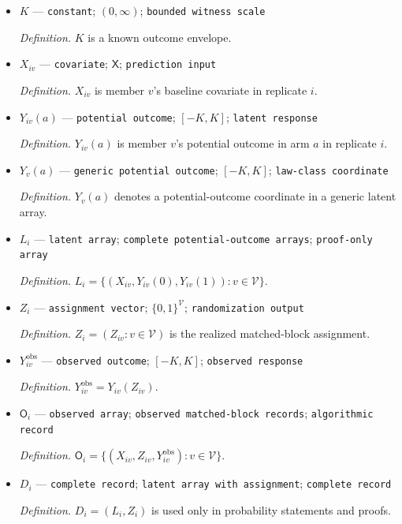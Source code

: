 \documentclass{article}
\begin{document}
\begin{itemize}
  \item \(K\) --- \texttt{constant}; \((0,\infty)\); \texttt{bounded witness scale}
  \par\smallskip\noindent\emph{Definition.} \(K\) is a known outcome envelope.
  \item \(X_{iv}\) --- \texttt{covariate}; \(\mathsf X\); \texttt{prediction input}
  \par\smallskip\noindent\emph{Definition.} \(X_{iv}\) is member \(v\)'s baseline covariate in replicate \(i\).
  \item \(Y_{iv}(a)\) --- \texttt{potential outcome}; \([-K,K]\); \texttt{latent response}
  \par\smallskip\noindent\emph{Definition.} \(Y_{iv}(a)\) is member \(v\)'s potential outcome in arm \(a\) in replicate \(i\).
  \item \(Y_v(a)\) --- \texttt{generic potential outcome}; \([-K,K]\); \texttt{law-\allowbreak{}class coordinate}
  \par\smallskip\noindent\emph{Definition.} \(Y_v(a)\) denotes a potential-outcome coordinate in a generic latent array.
  \item \(L_i\) --- \texttt{latent array}; \texttt{complete potential-\allowbreak{}outcome arrays}; \texttt{proof-\allowbreak{}only array}
  \par\smallskip\noindent\emph{Definition.} \(L_i=\{(X_{iv},Y_{iv}(0),Y_{iv}(1)):v\in\mathcal V\}\).
  \item \(Z_i\) --- \texttt{assignment vector}; \(\{0,1\}^{\mathcal V}\); \texttt{randomization output}
  \par\smallskip\noindent\emph{Definition.} \(Z_i=(Z_{iv}:v\in\mathcal V)\) is the realized matched-block assignment.
  \item \(Y^{\mathrm{obs}}_{iv}\) --- \texttt{observed outcome}; \([-K,K]\); \texttt{observed response}
  \par\smallskip\noindent\emph{Definition.} \(Y^{\mathrm{obs}}_{iv}=Y_{iv}(Z_{iv})\).
  \item \(\mathsf O_i\) --- \texttt{observed array}; \texttt{observed matched-\allowbreak{}block records}; \texttt{algorithmic record}
  \par\smallskip\noindent\emph{Definition.} \(\mathsf O_i=\{(X_{iv},Z_{iv},Y^{\mathrm{obs}}_{iv}):v\in\mathcal V\}\).
  \item \(D_i\) --- \texttt{complete record}; \texttt{latent array with assignment}; \texttt{complete record}
  \par\smallskip\noindent\emph{Definition.} \(D_i=(L_i,Z_i)\) is used only in probability statements and proofs.

\end{itemize}
\end{document}
